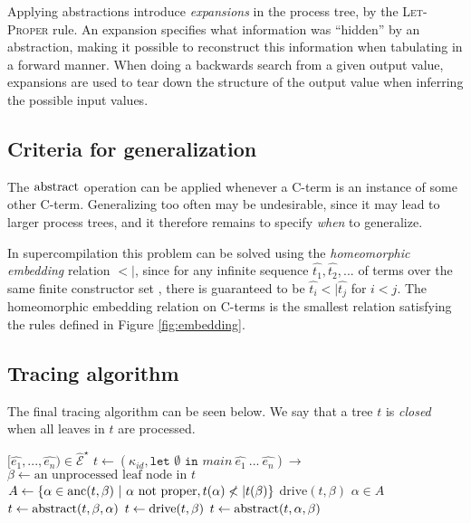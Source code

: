 \documentclass[10pt]{../sigplanconf}
\newcommand{\anc}{\ensuremath{{\rm anc}}}
\newcommand{\gen}{\ensuremath{~{\leq\kern-6pt \raisebox{1pt}{$\cdot$}}~}}
\begin{document}
Applying abstractions introduce \emph{expansions} in the process tree,
by the \textsc{Let-Proper} rule. An expansion specifies what
information was ``hidden'' by an abstraction, making it possible to
reconstruct this information when tabulating in a forward manner. When
doing a backwards search from a given output value, expansions are
used to tear down the structure of the output value when inferring the
possible input values.

\subsection{Criteria for generalization}
The ${\rm abstract}$ operation can be applied whenever a C-term is an
instance of some other C-term. Generalizing too often may be
undesirable, since it may lead to larger process trees, and it
therefore remains to specify \emph{when} to generalize.

In supercompilation\cite{sorensen1998introduction} this problem can be
solved using the \emph{homeomorphic embedding} relation $<|$, since
for any infinite sequence $\widehat{t_1}, \widehat{t_2}, ...$ of terms
over the same finite constructor set , there is guaranteed to be
$\widehat{t_i} <| \widehat{t_j}$ for $i < j$. The homeomorphic
embedding relation on C-terms is the smallest relation satisfying the
rules defined in Figure \ref{fig:embedding}.

\subsection{Tracing algorithm}
The final tracing algorithm can be seen below. We say that a tree $t$
is \emph{closed} when all leaves in $t$ are processed.
\begin{algorithmic}
   $[\widehat{e_1}, ..., \widehat{e_n}) \in \widehat{\mathcal{E}}^\star$
  \STATE $t\gets (\kappa_{id}, \texttt{let $\emptyset$ in $main~\widehat{e_1}~...~\widehat{e_n}$})\rightarrow$
    \STATE $\beta\gets\text{an unprocessed leaf node in $t$}$
    \STATE $A\gets\{ \alpha\in\anc(t,\beta) ~|~ \alpha\text{ not proper}, t(\alpha) \not<| t(\beta)  \}$
      \STATE $\textrm{drive}(t,\beta)$
    \ELSE
      $\alpha \in A$
      \IF{$t_\mathcal{L}(\alpha) \gen t_\mathcal{L}(\beta)$}
       \STATE $t\gets {\rm abstract}(t,\beta,\alpha)$
        \STATE $t\gets {\rm drive}(t,\beta)$
      \ELSE
        \STATE $t\gets {\rm abstract}(t,\alpha,\beta)$
      \ENDIF
    \ENDIF
  \ENDWHILE
\end{algorithmic}
\end{document}
